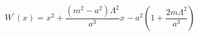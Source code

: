 \begin{equation} \label{W44}
W^{\prime}(x)=x^2+\frac{(m^2-a^2)\Lambda^2}{a^3}x-a^2(1+\frac{2m\Lambda^2}{a^3})
\end{equation}

